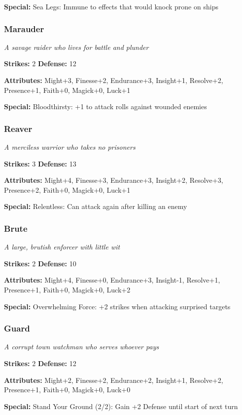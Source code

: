 \documentclass[10pt,twoside]{article}
\begin{document}
\textbf{Special:} Sea Legs: Immune to effects that would knock prone on ships

\subsubsection{Marauder}
\textit{A savage raider who lives for battle and plunder}

\textbf{Strikes:} 2 \quad \textbf{Defense:} 12

\textbf{Attributes:} Might+3, Finesse+2, Endurance+3, Insight+1, Resolve+2, Presence+1, Faith+0, Magick+0, Luck+1

\textbf{Special:} Bloodthirsty: +1 to attack rolls against wounded enemies

\subsubsection{Reaver}
\textit{A merciless warrior who takes no prisoners}

\textbf{Strikes:} 3 \quad \textbf{Defense:} 13

\textbf{Attributes:} Might+4, Finesse+3, Endurance+3, Insight+2, Resolve+3, Presence+2, Faith+0, Magick+0, Luck+1

\textbf{Special:} Relentless: Can attack again after killing an enemy

\subsubsection{Brute}
\textit{A large, brutish enforcer with little wit}

\textbf{Strikes:} 2 \quad \textbf{Defense:} 10

\textbf{Attributes:} Might+4, Finesse+0, Endurance+3, Insight-1, Resolve+1, Presence+1, Faith+0, Magick+0, Luck+2

\textbf{Special:} Overwhelming Force: +2 strikes when attacking surprised targets

\subsubsection{Guard}
\textit{A corrupt town watchman who serves whoever pays}

\textbf{Strikes:} 2 \quad \textbf{Defense:} 12

\textbf{Attributes:} Might+2, Finesse+2, Endurance+2, Insight+1, Resolve+2, Presence+1, Faith+0, Magick+0, Luck+0

\textbf{Special:} Stand Your Ground (2/2): Gain +2 Defense until start of next turn
\end{document}
